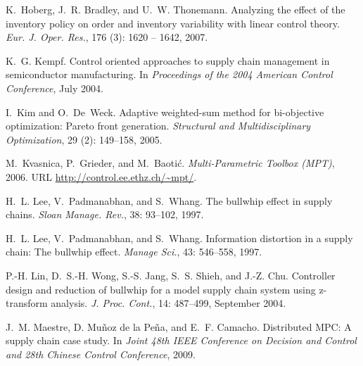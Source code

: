 \documentclass{elsarticle}
\theoremstyle{definition}
\begin{document}
\begin{thebibliography}{28}
K.~Hoberg, J.~R. Bradley, and U.~W. Thonemann.
\newblock Analyzing the effect of the inventory policy on order and inventory
  variability with linear control theory.
\newblock \emph{Eur. J. Oper. Res.}, 176 (3): 1620 -- 1642,
  2007.

K.~G. Kempf.
\newblock Control oriented approaches to supply chain management in
  semiconductor manufacturing.
\newblock In \emph{Proceedings of the 2004 American Control Conference}, July
  2004.

I.~Kim and O.~De~Weck.
\newblock Adaptive weighted-sum method for bi-objective optimization: Pareto
  front generation.
\newblock \emph{Structural and Multidisciplinary Optimization}, 29
  (2): 149--158, 2005.

M.~Kvasnica, P.~Grieder, and M.~Baoti\'{c}.
\newblock \emph{{Multi-Parametric Toolbox (MPT)}}, 2006.
\newblock URL \url{http://control.ee.ethz.ch/~mpt/}.

H.~L. Lee, V.~Padmanabhan, and S.~Whang.
\newblock The bullwhip effect in supply chains.
\newblock \emph{Sloan Manage. Rev.}, 38: 93--102, 1997{}.

H.~L. Lee, V.~Padmanabhan, and S.~Whang.
\newblock Information distortion in a supply chain: The bullwhip effect.
\newblock \emph{Manage Sci.}, 43: 546--558, 1997{}.

P.-H. Lin, D.~S.-H. Wong, S.-S. Jang, S.~S. Shieh, and J.-Z. Chu.
\newblock Controller design and reduction of bullwhip for a model supply chain
  system using z-transform analysis.
\newblock \emph{J. Proc. Cont.}, 14: 487--499, September 2004.

J.~M. Maestre, {D. Mu\~noz de la Pe\~na}, and E.~F. Camacho.
\newblock Distributed {MPC}: {A} supply chain case study.
\newblock In \emph{Joint 48th {IEEE} Conference on Decision and Control and
  28th Chinese Control Conference}, 2009.


\end{thebibliography}
\end{document}
